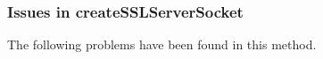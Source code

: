 

\subsubsection{Issues in createSSLServerSocket}
The following problems have been found in this method.

